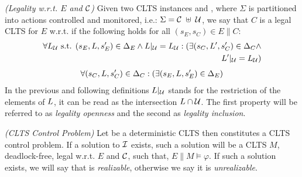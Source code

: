 \begin{definition}
	\label{def:legal_clts} \emph{(Legality w.r.t. $E$ and $\mathcal{C}$)} 
	Given two CLTS instances  and , where $\Sigma$ is partitioned into actions controlled and monitored, i.e.: $\Sigma=\mathcal{C} \; \uplus \;\mathcal{U}$, we say that $C$ is a legal CLTS for $E$ w.r.t. \controlSet if the following holds for all $(s_E,s_C) \in E \parallel C$:
	\footnotesize
	\begin{align}\begin{aligned}
	\forall L_{\mathcal{U}}\text{ s.t. }  (s_E, L, s'_E) \in \Delta_E \wedge L|_{\mathcal{U}} = L_{\mathcal{U}}:( \exists (s_C, L', s'_C) \in \Delta_C \wedge\\ L'|_{\mathcal{U}} = L_{\mathcal{U}})
	\end{aligned}\end{align}	
	\begin{align}
	\forall (s_C, L, s'_C) \in \Delta_C:( \exists (s_E, L, s'_E) \in \Delta_E)
	\end{align}	
	\normalsize
	In the previous and following definitions $L|_{\mathcal{U}}$ stands for the restriction of the elements of $L$, it can be read as the intersection $L \cap \mathcal{U}$.
	The first property will be referred to as \emph{legality openness} and the second as \emph{legality inclusion}.
\end{definition}

\begin{definition}
	\label{def:clts_control_problem} \emph{(CLTS Control Problem)} 
	Let  be a deterministic CLTS then \controlProblemDef constitutes a CLTS control problem. If a solution to $\mathcal{I}$ exists, such a solution will be a CLTS $M$, deadlock-free, legal w.r.t. $E$ and $\mathcal{C}$, such that, $E \parallel M \models \varphi$. If such a solution exists, we will say that \controlProblem is \emph{realizable}, otherwise we say it is \emph{unrealizable}.
\end{definition}
